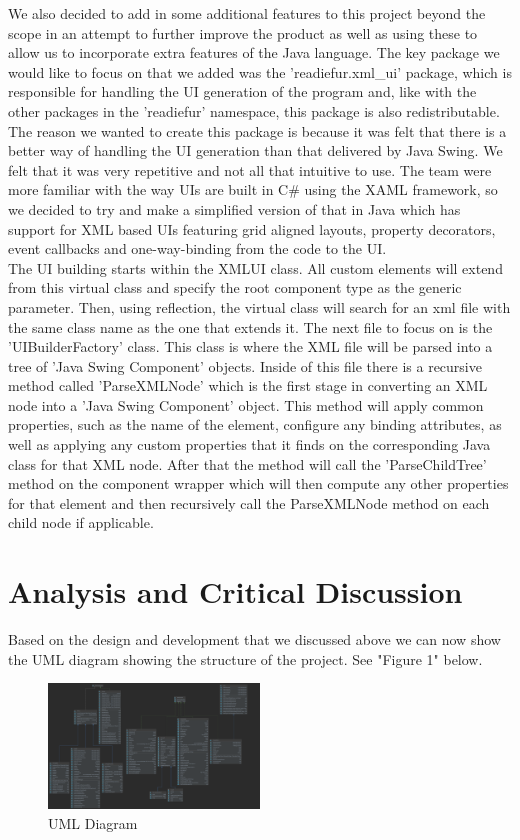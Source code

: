 \documentclass{COMPXXXX}
\begin{document}
\normalsize \textrm {We also decided to add in some additional features to this project beyond the scope in an attempt to further improve the product as well as using these to allow us to incorporate extra features of the Java language. The key package we would like to focus on that we added was the 'readiefur.xml\_ui' package, which is responsible for handling the UI generation of the program and, like with the other packages in the 'readiefur' namespace, this package is also redistributable. The reason we wanted to create this package is because it was felt that there is a better way of handling the UI generation than that delivered by Java Swing. We felt that it was very repetitive and not all that intuitive to use. The team were more familiar with the way UIs are built in C\# using the XAML framework, so we decided to try and make a simplified version of that in Java which has support for XML based UIs featuring grid aligned layouts, property decorators, event callbacks and one-way-binding from the code to the UI.\\
The UI building starts within the XMLUI class. All custom elements will extend from this virtual class and specify the root component type as the generic parameter. Then, using reflection, the virtual class will search for an xml file with the same class name as the one that extends it. The next file to focus on is the 'UIBuilderFactory' class. This class is where the XML file will be parsed into a tree of 'Java Swing Component' objects. Inside of this file there is a recursive method called 'ParseXMLNode' which is the first stage in converting an XML node into a 'Java Swing Component' object. This method will apply common properties, such as the name of the element, configure any binding attributes, as well as applying any custom properties that it finds on the corresponding Java class for that XML node. After that the method will call the 'ParseChildTree' method on the component wrapper which will then compute any other properties for that element and then recursively call the ParseXMLNode method on each child node if applicable.}

\section{Analysis and Critical Discussion}
\normalsize \textrm {Based on the design and development that we discussed above we can now show the UML diagram showing the structure of the project. See "Figure 1" below.}
\begin{figure}[h]
\centering
\includegraphics[width=0.5\textwidth]{uml.png}
\caption{UML Diagram}
\label{fig:figure1}
\end{figure}
\end{document}
